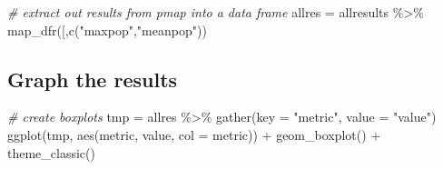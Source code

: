 \documentclass[
]{article}
\newenvironment{Shaded}{\begin{snugshade}}{\end{snugshade}}
\newcommand{\AttributeTok}[1]{\textcolor[rgb]{0.77,0.63,0.00}{#1}}
\newcommand{\CommentTok}[1]{\textcolor[rgb]{0.56,0.35,0.01}{\textit{#1}}}
\newcommand{\DecValTok}[1]{\textcolor[rgb]{0.00,0.00,0.81}{#1}}
\newcommand{\FunctionTok}[1]{\textcolor[rgb]{0.00,0.00,0.00}{#1}}
\newcommand{\NormalTok}[1]{#1}
\newcommand{\OtherTok}[1]{\textcolor[rgb]{0.56,0.35,0.01}{#1}}
\newcommand{\SpecialCharTok}[1]{\textcolor[rgb]{0.00,0.00,0.00}{#1}}
\newcommand{\StringTok}[1]{\textcolor[rgb]{0.31,0.60,0.02}{#1}}
\begin{document}
\begin{Shaded}
\end{Shaded}

\begin{Shaded}
\begin{Highlighting}[]
\CommentTok{\# extract out results from pmap into a data frame}
\NormalTok{allres }\OtherTok{=}\NormalTok{ allresults }\SpecialCharTok{\%\textgreater{}\%} \FunctionTok{map\_dfr}\NormalTok{(}\StringTok{\textasciigrave{}}\AttributeTok{[}\StringTok{\textasciigrave{}}\NormalTok{,}\FunctionTok{c}\NormalTok{(}\StringTok{"maxpop"}\NormalTok{,}\StringTok{"meanpop"}\NormalTok{))}
\end{Highlighting}
\end{Shaded}

\hypertarget{graph-the-results}{%
\subsection{Graph the results}\label{graph-the-results}}

\begin{Shaded}
\begin{Highlighting}[]
\CommentTok{\# create boxplots}
\NormalTok{tmp }\OtherTok{=}\NormalTok{ allres }\SpecialCharTok{\%\textgreater{}\%} \FunctionTok{gather}\NormalTok{(}\AttributeTok{key =} \StringTok{"metric"}\NormalTok{, }\AttributeTok{value =} \StringTok{"value"}\NormalTok{)}
\FunctionTok{ggplot}\NormalTok{(tmp, }\FunctionTok{aes}\NormalTok{(metric, value, }\AttributeTok{col =}\NormalTok{ metric)) }\SpecialCharTok{+} 
  \FunctionTok{geom\_boxplot}\NormalTok{() }\SpecialCharTok{+} 
  \FunctionTok{theme\_classic}\NormalTok{() }
\end{Highlighting}
\end{Shaded}
\end{document}
